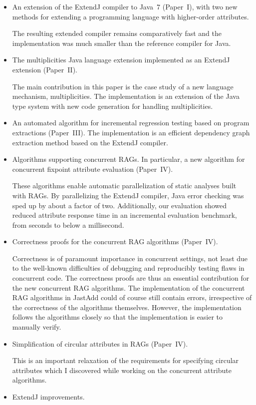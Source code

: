 \documentclass[10pt, twoside, openright]{book}
\begin{document}
\begin{itemize}
  \item An extension of the ExtendJ compiler to Java~7 (Paper~I),
    with two new methods for extending a programming language with higher-order
    attributes.

    The resulting extended compiler remains comparatively
    fast and the implementation was much smaller than the reference
    compiler for Java.
  \item The multiplicities Java language extension implemented as an ExtendJ extension (Paper~II).

    The main contribution in this paper is the case study of a new language mechanism,
    multiplicities.  The implementation is an extension of the Java type system
    with new code generation for handling multiplicities.
  \item An automated algorithm for incremental regression testing
    based on program extractions (Paper~III).
      The implementation is an efficient dependency graph extraction method
      based on the ExtendJ compiler.
  \item Algorithms supporting concurrent RAGs. In particular, a new algorithm for concurrent
    fixpoint attribute evaluation (Paper~IV).

    These algorithms enable automatic parallelization of static analyses built with RAGs.
    By parallelizing the ExtendJ compiler, Java error checking was sped up by about a factor of two.
    Additionally, our evaluation showed reduced attribute response time in an incremental
    evaluation benchmark, from seconds to below a millisecond.
  \item Correctness proofs for the concurrent RAG algorithms (Paper~IV).

    Correctness is of paramount importance in concurrent settings, not least due
    to the well-known difficulties of debugging and reproducibly testing flaws in concurrent code.
    The correctness proofs are thus an essential contribution for the new concurrent RAG algorithms.
    The implementation of the concurrent RAG algorithms in JastAdd could of course still contain
    errors, irrespective of the correctness of the algorithms themselves.
    However, the implementation follows the algorithms closely so that the implementation is
    easier to manually verify.
  \item Simplification of circular attributes in RAGs (Paper~IV).

    This is an important relaxation of the requirements for specifying circular attributes
    which I discovered while working on the concurrent attribute algorithms.
  \item ExtendJ improvements.


\end{itemize}
\end{document}
